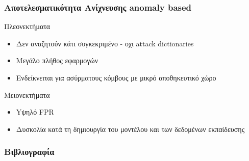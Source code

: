 \documentclass[handouts,hyperref={pdfpagelabels=false}]{beamer}
\begin{document}
\begin{frame}
\frametitle{\foreignlanguage{greek}{Αποτελεσματικότητα Ανίχνευσης \textlatin{anomaly based}}}
\begin{block}{Πλεονεκτήματα}
\begin{itemize}
    \item Δεν αναζητούν κάτι συγκεκριμένο - οχι \textlatin{attack dictionaries}
    \item Μεγάλο πλήθος εφαρμογών
    \item Ενδείκνειται για ασύρματους κόμβους με μικρό αποθηκευτικό χώρο
\end{itemize}
\end{block}

\begin{block}{Μειονεκτήματα}
\begin{itemize}
    \item Yψηλό \textlatin{FPR}
    \item Δυσκολία κατά τη δημιουργία του μοντέλου και των δεδομένων εκπαίδευσης
\end{itemize}
\end{block}
\end{frame}

\begin{frame}[allowframebreaks]
\frametitle{\foreignlanguage{greek}{Βιβλιογραφία}}
\nocite{*}


\end{frame}
\end{document}
